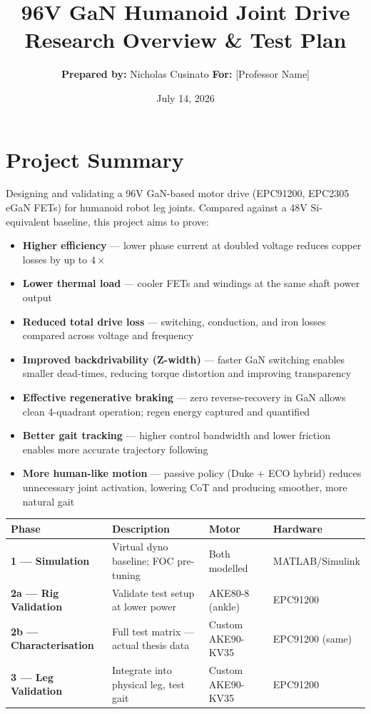 \documentclass[11pt]{article}
\title{\vspace{-1.5cm}\textbf{96V GaN Humanoid Joint Drive}\\ \large Research Overview \& Test Plan}
\author{\textbf{Prepared by:} Nicholas Cusinato \quad \textbf{For:} [Professor Name]}
\date{July 14, 2026}
\begin{document}
\maketitle
\vspace{-0.5cm}

\section*{Project Summary}
Designing and validating a 96V GaN-based motor drive (EPC91200, EPC2305 eGaN FETs) for humanoid robot leg joints. Compared against a 48V Si-equivalent baseline, this project aims to prove:

\begin{itemize}[noitemsep, topsep=0pt]
    \item \textbf{Higher efficiency} — lower phase current at doubled voltage reduces copper losses by up to $4\times$
    \item \textbf{Lower thermal load} — cooler FETs and windings at the same shaft power output
    \item \textbf{Reduced total drive loss} — switching, conduction, and iron losses compared across voltage and frequency
    \item \textbf{Improved backdrivability (Z-width)} — faster GaN switching enables smaller dead-times, reducing torque distortion and improving transparency
    \item \textbf{Effective regenerative braking} — zero reverse-recovery in GaN allows clean 4-quadrant operation; regen energy captured and quantified
    \item \textbf{Better gait tracking} — higher control bandwidth and lower friction enables more accurate trajectory following
    \item \textbf{More human-like motion} — passive policy (Duke + ECO hybrid) reduces unnecessary joint activation, lowering CoT and producing smoother, more natural gait
\end{itemize}

\vspace{0.3cm}
\noindent
\begin{tabularx}{\textwidth}{@{}l l l X@{}}
\toprule
\textbf{Phase} & \textbf{Description} & \textbf{Motor} & \textbf{Hardware} \\
\midrule
\textbf{1 — Simulation} & Virtual dyno baseline; FOC pre-tuning & Both modelled & MATLAB/Simulink \\
\textbf{2a — Rig Validation} & Validate test setup at lower power & AKE80-8 (ankle) & EPC91200 \\
\textbf{2b — Characterisation} & Full test matrix — actual thesis data & Custom AKE90-KV35 & EPC91200 (same) \\
\textbf{3 — Leg Validation} & Integrate into physical leg, test gait & Custom AKE90-KV35 & EPC91200 \\
\bottomrule
\end{tabularx}
\end{document}
